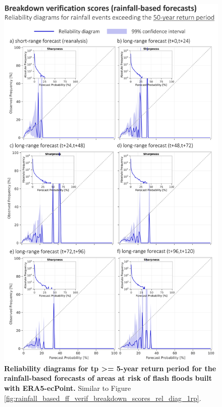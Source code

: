 \begin{figure}[htbp]
\centering
\includegraphics[width=\textwidth]{rainfall_based_ff_verif_breakdown_scores_rel_diag_50rp.png}
\caption{\textbf{Reliability diagrams for tp >= 5-year return period for the rainfall-based forecasts of areas at risk of flash floods built with ERA5-ecPoint.} Similar to Figure \ref{fig:rainfall_based_ff_verif_breakdown_scores_rel_diag_1rp}.}
\label{fig:rainfall_based_ff_verif_breakdown_scores_rel_diag_50rp}
\end{figure}

